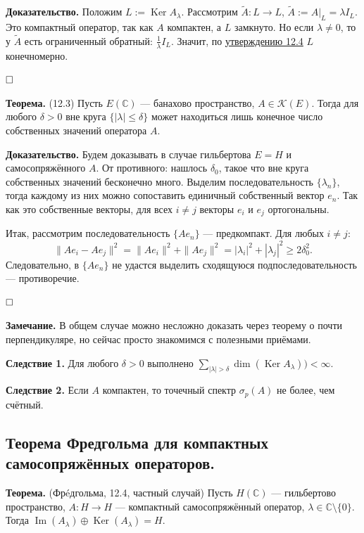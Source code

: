 \documentclass[12pt, a4paper]{article}
\DeclareMathOperator{\im}{Im}
\DeclareMathOperator{\Ker}{Ker}
\newcommand{\QED}{$\hfill\square$}
\renewcommand{\le}{\leqslant}  %
\renewcommand{\ge}{\geqslant}  %
\begin{document}
\textbf{Доказательство.} Положим $L := \Ker A_\lambda$. Рассмотрим $\tilde A: L \to L$, $\tilde A := A|_L = \lambda I_L$. Это компактный оператор, так как $A$ компактен, а $L$ замкнуто. Но если $\lambda \neq 0$, то у $\tilde A$ есть ограниченный обратный: $\frac{1}{\lambda}I_L$. Значит, по \hyperref[st:12.4]{утверждению 12.4} $L$ конечномерно.

\QED

 \label{th:12-3} \textbf{Теорема.} (12.3) Пусть $E(\mathbb C)$ --- банахово пространство, $A \in \mathcal K(E)$.
Тогда для любого $\delta > 0$ вне круга $\{|\lambda| \le \delta\}$ может находиться лишь конечное число собственных значений оператора $A$.

\textbf{Доказательство.} Будем доказывать в случае гильбертова $E = H$ и самосопряжённого $A$.
От противного: нашлось $\delta_0$, такое что вне круга собственных значений бесконечно много.
Выделим последовательность $\{\lambda_n\}$, тогда каждому из них можно сопоставить единичный собственный вектор $e_n$.
Так как это собственные векторы, для всех $i \ne j$ векторы $e_i$ и $e_j$ ортогональны.

Итак, рассмотрим последовательность $\{Ae_n\}$ --- предкомпакт.
Для любых $i \ne j$:
\[
    \|Ae_i - Ae_j\|^2 = \|Ae_i\|^2 + \|Ae_j\|^2 = |\lambda_i|^2 + |\lambda_j|^2 \ge 2\delta_0^2.
\]
Следовательно, в $\{Ae_n\}$ не удастся выделить сходящуюся подпоследовательность --- противоречие.

\QED

\textbf{Замечание.} В общем случае можно несложно доказать через теорему о почти перпендикуляре, но сейчас просто знакомимся с полезными приёмами.

\textbf{Следствие 1.} Для любого $\delta > 0$ выполнено $\sum_{|\lambda| > \delta} \dim(\Ker A_\lambda)) < \infty$.

\textbf{Следствие 2.} Если $A$ компактен, то точечный спектр $\sigma_p(A)$ не более, чем счётный.



\subsection{Теорема Фредгольма для компактных самосопряжённых операторов.}

 \label{th:12-4} \textbf{Теорема.} (Фрéдгольма, 12.4, частный случай)
Пусть $H(\mathbb C)$ --- гильбертово пространство, $A: H \to H$ --- компактный самосопряжённый оператор, $\lambda \in \mathbb C \setminus \{0\}$.
Тогда $\im(A_\lambda) \oplus \Ker(A_\lambda) = H$.
\end{document}
